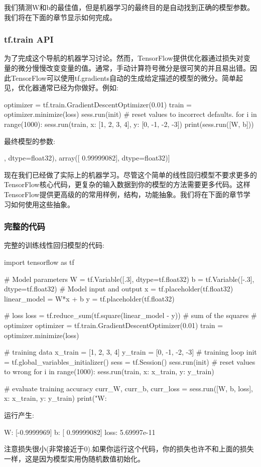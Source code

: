 我们猜测W和b的最佳值，但是机器学习的最终目的是自动找到正确的模型参数。我们将在下面的章节显示如何完成。

\subsubsection{tf.train API}
为了完成这个导航的机器学习讨论。然而，TensorFlow提供优化器通过损失对变量的微分慢慢改变变量的值。通常，手动计算符号微分是很可笑的并且易出错。因此TensorFlow可以使用tf.gradients自动的生成给定描述的模型的微分。简单起见，优化器通常已经为你做好。例如:
\begin{pythoncode}
optimizer = tf.train.GradientDescentOptimizer(0.01)
train = optimizer.minimize(loss)
sess.run(init) # reset values to incorrect defaults.
for i in range(1000):
  sess.run(train, {x: [1, 2, 3, 4], y: [0, -1, -2, -3]})
print(sess.run([W, b]))
\end{pythoncode}
最终模型的参数:
\begin{pythoncode}
[array([-0.9999969], dtype=float32), array([ 0.99999082], dtype=float32)]
\end{pythoncode}
现在我们已经做了实际上的机器学习。尽管这个简单的线性回归模型不要求更多的TensorFlow核心代码，更复杂的输入数据到你的模型的方法需要更多代码。这样TensorFlow提供更高级的的常用样例，结构，功能抽象。我们将在下面的章节学习如何使用这些抽象。
\subsubsection{完整的代码}
完整的训练线性回归模型的代码:
\begin{pythoncode}
import tensorflow as tf

# Model parameters
W = tf.Variable([.3], dtype=tf.float32)
b = tf.Variable([-.3], dtype=tf.float32)
# Model input and output
x = tf.placeholder(tf.float32)
linear_model = W*x + b
y = tf.placeholder(tf.float32)

# loss
loss = tf.reduce_sum(tf.square(linear_model - y)) # sum of the squares
# optimizer
optimizer = tf.train.GradientDescentOptimizer(0.01)
train = optimizer.minimize(loss)

# training data
x_train = [1, 2, 3, 4]
y_train = [0, -1, -2, -3]
# training loop
init = tf.global_variables_initializer()
sess = tf.Session()
sess.run(init) # reset values to wrong
for i in range(1000):
  sess.run(train, {x: x_train, y: y_train})

# evaluate training accuracy
curr_W, curr_b, curr_loss = sess.run([W, b, loss], {x: x_train, y: y_train})
print("W: %
\end{pythoncode}
运行产生:
\begin{pythoncode}
W: [-0.9999969] b: [ 0.99999082] loss: 5.69997e-11
\end{pythoncode}
注意损失很小(非常接近于0).如果你运行这个代码，你的损失也许不和上面的损失一样，这是因为模型实用伪随机数值初始化。

